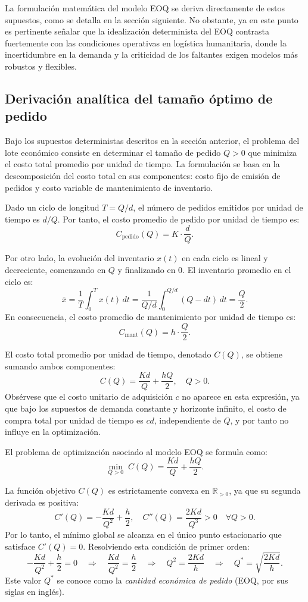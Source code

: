 \documentclass[
  spanish,
  us-letterpaper,
  DIV=11,
  numbers=noendperiod]{scrreprt}
\numberwithin{equation}{section}
\begin{document}
La formulación matemática del modelo EOQ se deriva directamente de estos
supuestos, como se detalla en la sección siguiente. No obstante, ya en
este punto es pertinente señalar que la idealización determinista del
EOQ contrasta fuertemente con las condiciones operativas en logística
humanitaria, donde la incertidumbre en la demanda y la criticidad de los
faltantes exigen modelos más robustos y flexibles.

\subsection{Derivación analítica del tamaño óptimo de
pedido}\label{derivaciuxf3n-analuxedtica-del-tamauxf1o-uxf3ptimo-de-pedido}

Bajo los supuestos deterministas descritos en la sección anterior, el
problema del lote económico consiste en determinar el tamaño de pedido
\(Q > 0\) que minimiza el costo total promedio por unidad de tiempo. La
formulación se basa en la descomposición del costo total en sus
componentes: costo fijo de emisión de pedidos y costo variable de
mantenimiento de inventario.

Dado un ciclo de longitud \(T = Q/d\), el número de pedidos emitidos por
unidad de tiempo es \(d/Q\). Por tanto, el costo promedio de pedido por
unidad de tiempo es: \[
C_{\text{pedido}}(Q) = K \cdot \frac{d}{Q}.
\]

Por otro lado, la evolución del inventario \(x(t)\) en cada ciclo es
lineal y decreciente, comenzando en \(Q\) y finalizando en \(0\). El
inventario promedio en el ciclo es: \[
\bar{x} = \frac{1}{T} \int_0^T x(t) \, dt = \frac{1}{Q/d} \int_0^{Q/d} (Q - d t) \, dt = \frac{Q}{2}.
\] En consecuencia, el costo promedio de mantenimiento por unidad de
tiempo es: \[
C_{\text{mant}}(Q) = h \cdot \frac{Q}{2}.
\]

El costo total promedio por unidad de tiempo, denotado \(C(Q)\), se
obtiene sumando ambos componentes: \[
C(Q) = \frac{K d}{Q} + \frac{h Q}{2}, \quad Q > 0.
\] Obsérvese que el costo unitario de adquisición \(c\) no aparece en
esta expresión, ya que bajo los supuestos de demanda constante y
horizonte infinito, el costo de compra total por unidad de tiempo es
\(c d\), independiente de \(Q\), y por tanto no influye en la
optimización.

El problema de optimización asociado al modelo EOQ se formula como: \[
\min_{Q > 0} \; C(Q) = \frac{K d}{Q} + \frac{h Q}{2}.
\]

La función objetivo \(C(Q)\) es estrictamente convexa en
\(\mathbb{R}_{>0}\), ya que su segunda derivada es positiva: \[
C'(Q) = -\frac{K d}{Q^2} + \frac{h}{2}, \quad
C''(Q) = \frac{2 K d}{Q^3} > 0 \quad \forall Q > 0.
\] Por lo tanto, el mínimo global se alcanza en el único punto
estacionario que satisface \(C'(Q) = 0\). Resolviendo esta condición de
primer orden: \[
-\frac{K d}{Q^2} + \frac{h}{2} = 0
\quad \Longrightarrow \quad
\frac{K d}{Q^2} = \frac{h}{2}
\quad \Longrightarrow \quad
Q^2 = \frac{2 K d}{h}
\quad \Longrightarrow \quad
Q^* = \sqrt{\frac{2 K d}{h}}.
\] Este valor \(Q^*\) se conoce como la \emph{cantidad económica de
pedido} (EOQ, por sus siglas en inglés).
\end{document}
